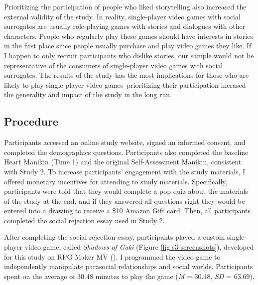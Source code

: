 \documentclass[
]{udthesis}
\begin{document}
Prioritizing the participation of people who liked storytelling also
increased the external validity of the study. In reality, single-player
video games with social surrogates are usually role-playing games with
stories and dialogues with other characters. People who regularly play
these games should have interests in stories in the first place since
people usually purchase and play video games they like. If I happen to
only recruit participants who dislike stories, our sample would not be
representative of the consumers of single-player video games with social
surrogates. The results of the study has the most implications for those
who are likely to play single-player video games--prioritizing their
participation incrased the generality and impact of the study in the
long run.

\subsection{Procedure}\label{procedure-1}

Participants accessed an online study website, signed an informed
consent, and completed the demographics questions. Participants also
completed the baseline Heart Manikin (Time 1) and the original
Self-Assessment Manikin, consistent with Study 2. To increase
participants' engagement with the study materials, I offered monetary
incentives for attending to study materials. Specifically, participants
were told that they would complete a pop quiz about the materials of the
study at the end, and if they answered all questions right they would be
entered into a drawing to receive a \$10 Amazon Gift card. Then, all
participants completed the social rejection essay used in Study 2.

After completing the social rejection essay, participants played a
custom single-player video game, called \emph{Shadows of Gaki} (Figure
\ref{fig:s3-screenshots}), developed for this study on RPG Maker MV
(). I programmed the video game to
independently manipulate parasocial relationships and social worlds.
Participants spent on the average of 30.48
minutes to play the game (\emph{M} = 30.48, \emph{SD} = 63.69).
\end{document}
